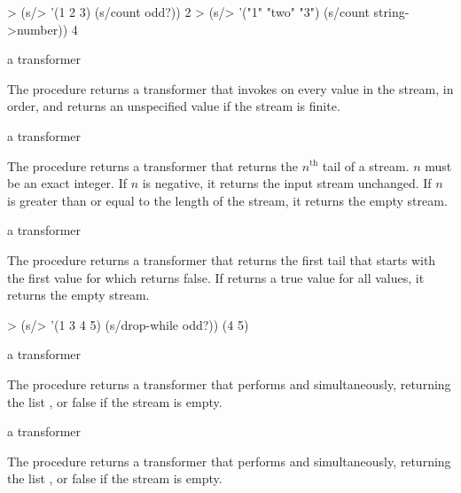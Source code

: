 \codebegin
> (s/> '(1 2 3) (s/count odd?))
2
> (s/> '("1" "two" "3") (s/count string->number))
4
\codeend

\begin{procedure}
\end{procedure}
\returns{} a transformer

The  procedure returns a transformer that invokes  on every
value in the stream, in order, and returns an unspecified value if the stream is finite.

\begin{procedure}
\end{procedure}
\returns{} a transformer

The  procedure returns a transformer that returns the $n^\textrm{th}$ tail of
a stream. $n$ must be an exact integer. If $n$ is negative, it returns the input stream
unchanged. If $n$ is greater than or equal to the length of the stream, it returns the
empty stream.

\begin{procedure}
\end{procedure}
\returns{} a transformer

The  procedure returns a transformer that returns the first tail that
starts with the first value for which  returns false. If 
returns a true value for all values, it returns the empty stream.

\codebegin
> (s/> '(1 3 4 5) (s/drop-while odd?))
(4 5)
\codeend

\begin{procedure}
\end{procedure}
\returns{} a transformer

The  procedure returns a transformer that performs  and
 simultaneously, returning the list , or false if
the stream is empty.

\begin{procedure}
\end{procedure}
\returns{} a transformer

The  procedure returns a transformer that performs  and
 simultaneously, returning the list , or false
if the stream is empty.

